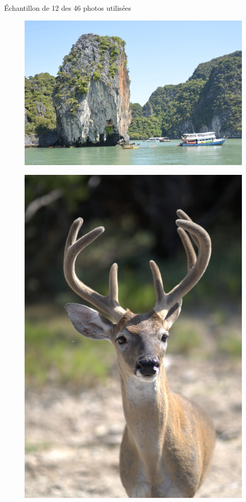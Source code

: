 \documentclass[xcolor=dvipsnames]{beamer}
\begin{document}
\begin{frame}{Échantillon de 12 des 46 photos utilisées}
\begin{minipage}{.23\textwidth}
\begin{figure}
        \end{figure}
        \begin{figure}
            \includegraphics[width=1\linewidth]{photos_utilises/3.jpg}
        \end{figure}
    \end{minipage}
    \hfill
    \begin{minipage}{.23\textwidth}
        \centering
        \begin{figure}
            \includegraphics[width=.75\linewidth]{photos_utilises/15.jpg}

\end{figure}
\end{minipage}
\end{frame}
\end{document}
